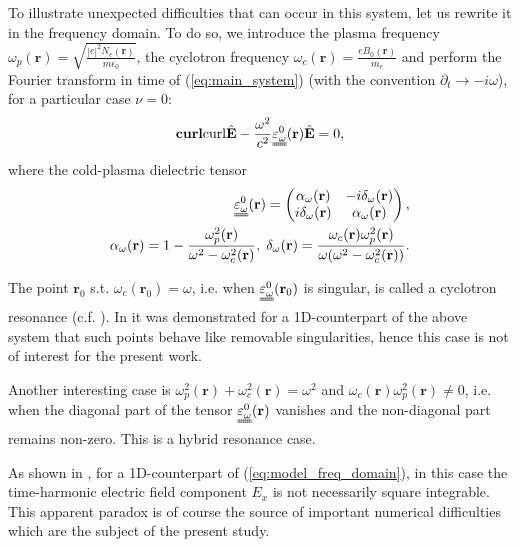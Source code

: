 {To illustrate unexpected difficulties that can occur in this system, let us rewrite it in the frequency domain. To do so, 
we introduce the plasma frequency $\omega_p(\mathbf{r})=\sqrt{\frac{|e|^2N_e(\mathbf{r})}{m\epsilon_0}}$, 
the cyclotron frequency $\omega_c(\mathbf{r})=\frac{e B_0(\mathbf{r})}{m_e}$ and perform the Fourier transform 
in time of (\ref{eq:main_system}) (with the convention $\partial_t\rightarrow -i\omega$), for a 
particular case $\nu=0$:
\begin{align}
\label{eq:model_freq_domain}
 \mathbf{curl}{\operatorname{curl}}\hat{\mathbf{E}}-\frac{\omega^2}{c^2}\uuline{\varepsilon_{\omega}^{0}}(\mathbf{r})\hat{\mathbf{E}}=0,
\end{align}
where the cold-plasma dielectric tensor \cite[Chapter 1-2]{Stix}
\begin{align}
\nonumber
\uuline{\varepsilon_{\omega}^{0}}(\mathbf{r})=\left(
 \begin{matrix}
  \alpha_{\omega}(\mathbf{r})& -i\delta_{\omega}(\mathbf{r})\\
  i\delta_{\omega}(\mathbf{r}) & \alpha_{\omega}(\mathbf{r})
 \end{matrix}
\right),\\
\label{eq:alpha_delta}
\alpha_{\omega}(\mathbf{r})=1-\frac{\omega_p^2(\mathbf{r})}{\omega^2-\omega_c^2(\mathbf{r})},\; \delta_{\omega}(\mathbf{r})=\frac{\omega_c(\mathbf{r})\omega_p^2(\mathbf{r})}{\omega(\omega^2-\omega_c^2(\mathbf{r}))}.
\end{align}

The point $\mathbf{r}_0$ s.t. $\omega_c(\mathbf{r}_0)=\omega$, i.e. when $\uuline{\varepsilon_{\omega}^{0}}(\mathbf{r}_0)$ is singular, is called a cyclotron resonance (c.f. \cite[Chapter 1-5]{Stix}). 
In \cite{singular_solutions} it was demonstrated for a 1D-counterpart of the above system that such points behave like removable singularities, 
hence this case is not of interest for the present work. 

Another interesting case is $\omega_p^2(\mathbf{r})+\omega_c^2(\mathbf{r})=\omega^2$ and $\omega_c(\mathbf{r})\omega_p^2(\mathbf{r})\neq 0$, i.e. when the diagonal part of the tensor 
$\uuline{\varepsilon_{\omega}^{0}}(\mathbf{r})$ vanishes and the non-diagonal part remains non-zero. This is a hybrid resonance case. 

As shown in \cite{Despres_2014, singular_solutions}, for a 1D-counterpart of (\ref{eq:model_freq_domain}), in this case the time-harmonic electric field component $E_x$ is not necessarily square 
integrable. This apparent paradox is of course the source of important numerical difficulties which are the subject of the present study. 


}
